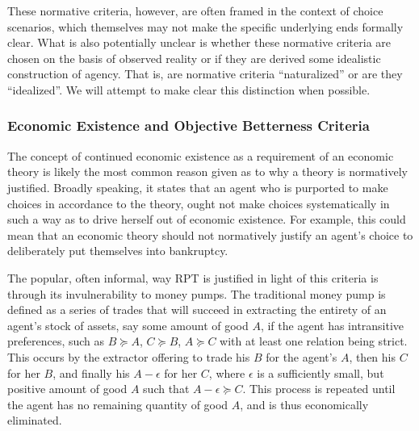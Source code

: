 These normative criteria, however, are often framed in the context of choice scenarios, which themselves may not make the specific underlying ends formally clear.
What is also potentially unclear is whether these normative criteria are chosen on the basis of observed reality or if they are derived some idealistic construction of agency.
That is, are normative criteria \enquote{naturalized} or are they \enquote{idealized}.
We will attempt to make clear this distinction when possible.

\subsubsection{Economic Existence and Objective Betterness Criteria}

The concept of continued economic existence as a requirement of an economic theory is likely the most common reason given as to why a theory is normatively justified.
Broadly speaking, it states that an agent who is purported to make choices in accordance to the theory, ought not make choices systematically in such a way as to drive herself out of economic existence.
For example, this could mean that an economic theory should not normatively justify an agent's choice to deliberately put themselves into bankruptcy.{\footnotemark}

\addtocounter{footnote}{-1}

The popular, often informal, way RPT is justified in light of this criteria is through its invulnerability to money pumps.
The traditional money pump is defined as a series of trades that will succeed in extracting the entirety of an agent's stock of assets, say some amount of good $A$, if the agent has intransitive preferences, such as $B \succcurlyeq A$, $C \succcurlyeq B$, $A \succcurlyeq C$ with at least one relation being strict.
This occurs by the extractor offering to trade his $B$ for the agent's $A$, then his $C$ for her $B$, and finally his $A - \epsilon$ for her $C$, where $\epsilon$ is a sufficiently small, but positive amount of good $A$ such that $A - \epsilon \succcurlyeq C$.
This process is repeated until the agent has no remaining quantity of good $A$, and is thus economically eliminated.

